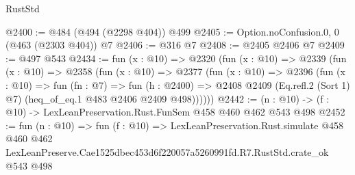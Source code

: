 \begin{lexlean}{RustStd}
\begin{coremodule}
@2400 := @484 (@494 (@2298 @404)) @499
@2405 := Option.noConfusion.{0, 0} (@463 (@2303 @404)) @7
@2406 := @316 @7
@2408 := @2405 @2406 @7
@2409 := @497 @543
@2434 := fun (x : @10) =>
  @2320
    (fun (x : @10) =>
    @2339
      (fun (x : @10) =>
      @2358
        (fun (x : @10) =>
        @2377
          (fun (x : @10) =>
          @2396
            (fun (x : @10) =>
            fun (fn : @7) =>
            fun (h : @2400) =>
            @2408 @2409 (Eq.refl.{2} (Sort 1) @7) (heq_of_eq.{1} @483 @2406 @2409 @498))))))
@2442 := (n : @10) -> (f : @10) -> LexLeanPreservation.Rust.FunSem @458 @460 @462 @543 @498
@2452 := fun (n : @10) =>
  fun (f : @10) =>
  LexLeanPreservation.Rust.simulate
    @458
    @460
    @462
    LexLeanPreserve.Cae1525dbec453d6f220057a5260991fd.R7.RustStd.crate_ok
    @543
    @498
\end{coremodule}
\end{lexlean}

